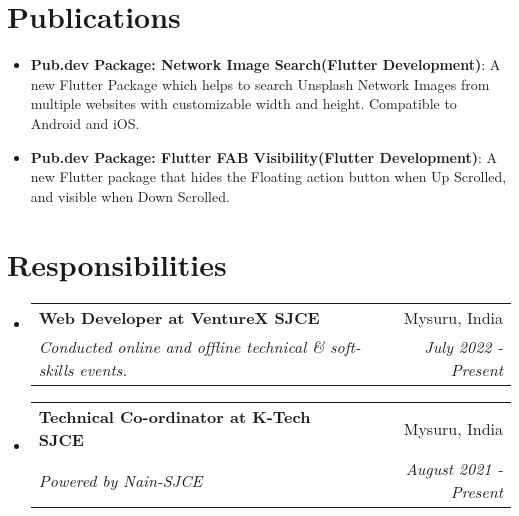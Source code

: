 \documentclass[a4paper,20pt]{article}
\makeatletter
\newcommand{\resumeItem}[2]{
  \item\small{
    \textbf{#1}{: #2 \vspace{-2pt}}
  }
}
\newcommand{\resumeSubheading}[4]{
  \vspace{-1pt}\item
    \begin{tabular*}{0.97\textwidth}{l@{\extracolsep{\fill}}r}
      \textbf{#1} & #2 \\
      \textit{#3} & \textit{#4} \\
    \end{tabular*}\vspace{-5pt}
}
\newcommand{\resumeSubItem}[2]{\resumeItem{#1}{#2}\vspace{-3pt}}
\newcommand{\resumeSubHeadingListStart}{\begin{itemize}[leftmargin=*]}
\newcommand{\resumeSubHeadingListEnd}{\end{itemize}}
\makeatother
\begin{document}

\section{Publications}
\vspace{5pt}
\resumeSubHeadingListStart
\resumeSubItem{Pub.dev Package: Network Image Search(Flutter Development)}{A new Flutter Package which helps to search Unsplash Network Images from multiple websites with customizable width and height. Compatible to Android and iOS.
}
\vspace{2pt}
\resumeSubItem{Pub.dev Package: Flutter FAB Visibility(Flutter Development)}{A new Flutter package that hides the Floating action button when Up Scrolled, and visible when Down Scrolled.}
\resumeSubHeadingListEnd

\vspace{5pt}
\section{Responsibilities}
\vspace{5pt}

  \resumeSubHeadingListStart
	\resumeSubheading
    {Web Developer at VentureX SJCE}{Mysuru, India}
    {Conducted online and offline technical \& soft-skills events.}{July 2022 - Present}
    \resumeSubheading
    {Technical Co-ordinator at K-Tech SJCE }{Mysuru, India}
    {Powered by Nain-SJCE}{August 2021 - Present}

\resumeSubHeadingListEnd
\end{document}
